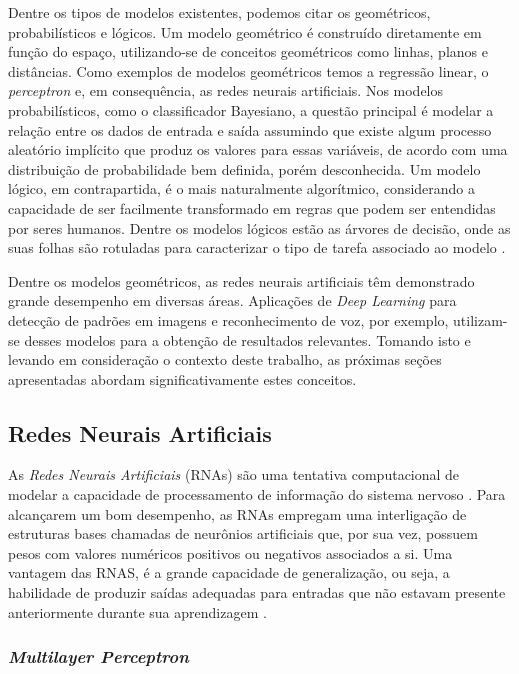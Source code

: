 Dentre os tipos de modelos existentes, podemos citar os geométricos, probabilísticos e lógicos. Um modelo geométrico é construído diretamente em função do espaço, utilizando-se de conceitos geométricos como linhas, planos e distâncias. Como exemplos de modelos geométricos temos a regressão linear, o \emph{perceptron} e, em consequência, as redes neurais artificiais. Nos modelos probabilísticos, como o classificador Bayesiano, a questão principal é modelar a relação entre os dados de entrada e saída assumindo que existe algum processo aleatório implícito que produz os valores para essas variáveis, de acordo com uma distribuição de probabilidade bem definida, porém desconhecida. Um modelo lógico, em contrapartida, é o mais naturalmente algorítmico, considerando a capacidade de ser facilmente transformado em regras que podem ser entendidas por seres humanos. Dentre os modelos lógicos estão as árvores de decisão, onde as suas folhas são rotuladas para caracterizar o tipo de tarefa associado ao modelo \cite{flach}.

Dentre os modelos geométricos, as redes neurais artificiais têm demonstrado grande desempenho em diversas áreas. Aplicações de \emph{Deep Learning} para detecção de padrões em imagens e reconhecimento de voz, por exemplo, utilizam-se desses modelos para a obtenção de resultados relevantes. Tomando isto e levando em consideração o contexto deste trabalho, as próximas seções apresentadas abordam significativamente estes conceitos.


\subsection{Redes Neurais Artificiais}
\label{subsec:rna}

As \emph{Redes Neurais Artificiais} (RNAs) são uma tentativa computacional de modelar a capacidade de processamento de informação do sistema nervoso \cite{rojas}. Para alcançarem um bom desempenho, as RNAs empregam uma interligação de estruturas bases chamadas de neurônios artificiais que, por sua vez, possuem pesos com valores numéricos positivos ou negativos associados a si. Uma vantagem das RNAS, é a grande capacidade de generalização, ou seja, a habilidade de produzir saídas adequadas para entradas que não estavam presente anteriormente durante sua aprendizagem \cite{haykin}.

\subsubsection{\emph{Multilayer Perceptron}}
\label{subsubsec:mlp}

